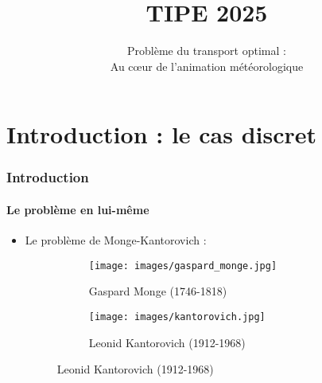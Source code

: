 \documentclass{beamer}
\title{TIPE 2025}
\author{} %
\institute{}
\date{Problème du transport optimal : \\ Au cœur de l'animation
météorologique}
\begin{document}
\begin{frame}
        \titlepage
		
\end{frame}


\section{Introduction : le cas discret}

\begin{frame}
    \frametitle{Introduction}
    \framesubtitle{Le problème en lui-même}
	\begin{itemize}
		\item Le problème de Monge-Kantorovich : 
		\begin{figure}[!htb]
			\centering
			\begin{subfigure}{0.4\textwidth}
				\centering
				\texttt{[image: images/gaspard\_monge.jpg]}
				\caption{Gaspard Monge (1746-1818)}
				\label{fig:monge}
			\end{subfigure}
			\hspace*{\fill}
			\begin{subfigure}{0.4\textwidth}
				\centering 
				\texttt{[image: images/kantorovich.jpg]}
				\caption{Leonid Kantorovich (1912-1968)}
				\label{fig:kantorovich}
			\end{subfigure}
			\label{fig:monge_kantorovich}
		\end{figure}
	\end{itemize}
   
   

\end{frame}
\end{document}
